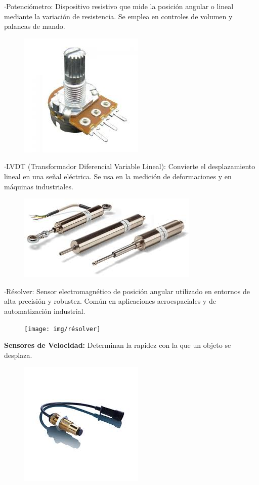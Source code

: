 	$\cdot$Potenciómetro: Dispositivo resistivo que mide la posición angular o lineal mediante la variación de resistencia. Se emplea en controles de volumen y palancas de mando.
	
\newpage
\begin{figure} [h]
	\centering
	\includegraphics[width=0.3\linewidth]{img/potenciometro}
	\caption{}
	\label{fig:potenciometro}
\end{figure}


	$\cdot$LVDT (Transformador Diferencial Variable Lineal): Convierte el desplazamiento lineal en una señal eléctrica. Se usa en la medición de deformaciones y en máquinas industriales.


\begin{figure} [h]
	\centering
	\includegraphics[width=0.3\linewidth]{img/lvdt}
	\caption{}
	\label{fig:lvdt}
\end{figure}


	$\cdot$Résolver: Sensor electromagnético de posición angular utilizado en entornos de alta precisión y robustez. Común en aplicaciones aeroespaciales y de automatización industrial.
	
	
\begin{figure} [h]
	\centering
	\texttt{[image: img/résolver]}
	\caption{}
	\label{fig:resolver}
\end{figure}
	
\newpage	
\textbf{Sensores de Velocidad:}
	Determinan la rapidez con la que un objeto se desplaza.
	
	
\begin{figure} [h]
	\centering
	\includegraphics[width=0.3\linewidth]{img/sensorvelocidad}
	\caption{}
	\label{fig:sensorvelocidad}
\end{figure}


